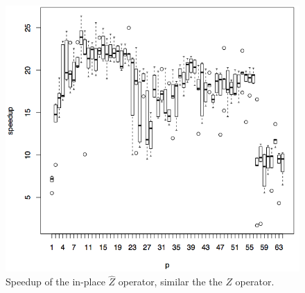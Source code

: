 \documentclass[a4paper,11pt, oneside]{report}
\begin{document}
\begin{figure}[p]
	\centering
	\includegraphics[width=\columnwidth]{control-z.png}
	\caption{Speedup of the in-place $\widehat{Z}$ operator, similar the the $Z$ operator.}
\end{figure}

\clearpage
\end{document}
